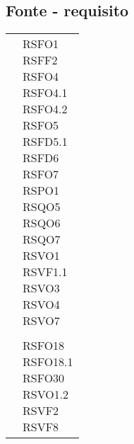 {{{{{{{{\subsection{Fonte - requisito}\label{RequisitiTracciamentoDeiRequisitiFonteRequisito}
\def\tabularxcolumn#1{m{#1}}
{
	\begin{center}
		\renewcommand{\arraystretch}{1.4}
		\begin{longtable}{|p{7.5cm}|p{7.5cm}|}
		\hline
		\rowcolor{airforceblue}
		\makecell[c]{\textbf{Fonte}} & \makecell[c]{\textbf{Codice RS}}  \\
		\hline
		\makecell[c]{Capitolato$_{\scaleto{G}{3pt}}$} & \makecell[c]{RSFO1\\RSFF2\\RSFO4\\RSFO4.1\\RSFO4.2\\RSFO5\\RSFD5.1\\RSFD6\\RSFO7\\RSPO1\\RSQO5\\RSQO6\\RSQO7\\RSVO1\\RSVF1.1\\RSVO3\\RSVO4\\RSVO7} \\
		\hline
		\hline
		\makecell[c]{Verbale esterno 2020-12-17} & \makecell[c]{RSFO1} \\
		\hline
		\makecell[c]{Verbale esterno 2021-02-02} & \makecell[c]{RSFO18\\RSFO18.1\\RSFO30\\RSVO1.2\\RSVF2\\RSVF8} \\
		\hline

\end{longtable}
\end{center}}}}}}}}}}
